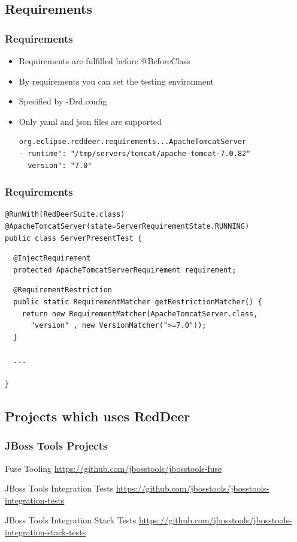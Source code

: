 \documentclass{beamer}
\begin{document}
\subsection{Requirements}
\begin{frame}[fragile]
\frametitle{Requirements}
\begin{itemize}
\item Requirements are fulfilled before @BeforeClass
\item By requirements you can set the testing environment
\item Specified by -Drd.config
\item Only yaml and json files are supported
\vspace{0.5cm}
\begin{verbatim}
org.eclipse.reddeer.requirements...ApacheTomcatServer
- runtime": "/tmp/servers/tomcat/apache-tomcat-7.0.82"
  version": "7.0"
\end{verbatim}
\end{itemize}
\end{frame}

\begin{frame}[fragile]
\frametitle{Requirements}
\begin{lstlisting}
@RunWith(RedDeerSuite.class)
@ApacheTomcatServer(state=ServerRequirementState.RUNNING)
public class ServerPresentTest {
\end{lstlisting}
\pause
\begin{lstlisting}
  @InjectRequirement
  protected ApacheTomcatServerRequirement requirement;
\end{lstlisting}
\pause
\begin{lstlisting}
  @RequirementRestriction
  public static RequirementMatcher getRestrictionMatcher() {
    return new RequirementMatcher(ApacheTomcatServer.class, 
      "version" , new VersionMatcher(">=7.0"));
  }

  ...

}
\end{lstlisting}
\end{frame}

\subsection{Projects which uses RedDeer}
\begin{frame}[fragile]
\frametitle{JBoss Tools Projects}
Fuse Tooling \newline
\url{https://github.com/jbosstools/jbosstools-fuse}

\vspace{0.5cm}
JBoss Tools Integration Tests \newline
\url{https://github.com/jbosstools/jbosstools-integration-tests}

\vspace{0.5cm}
JBoss Tools Integration Stack Tests \newline
\url{https://github.com/jbosstools/jbosstools-integration-stack-tests}
\end{frame}
\end{document}
